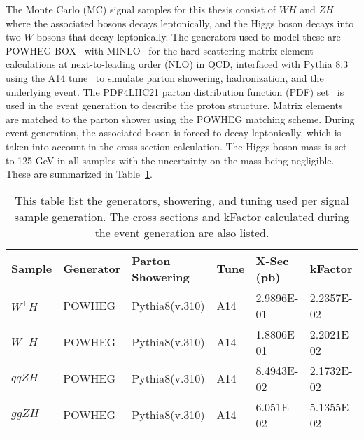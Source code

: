 The Monte Carlo (MC) signal samples for this thesis consist of $WH$ and $ZH$ where the associated bosons decays leptonically, and the Higgs boson decays into two $W$ bosons that decay leptonically. The generators used to model these are POWHEG-BOX~\cite{powheg} with MINLO~\cite{minlo} for the hard-scattering matrix element calculations at next-to-leading order (NLO) in QCD, interfaced with Pythia 8.3~\cite{pythia8.3} using the A14 tune~\cite{ATL-PHYS-PUB-2014-021} to simulate parton showering, hadronization, and the underlying event. The PDF4LHC21 parton distribution function (PDF) set~\cite{PDF4LHCWorkingGroup_pdfsetrun3} is used in the event generation to describe the proton structure. Matrix elements are matched to the parton shower using the POWHEG matching scheme. During event generation, the associated boson is forced to decay leptonically, which is taken into account in the cross section calculation. The Higgs boson mass is set to 125 GeV in all samples with the uncertainty on the mass being negligible. These are summarized in Table~\ref{tab:mc_signal_samples}.

\begin{table}
  \centering
  \begin{tabular}{l|l|l|l|l|l}
    \hline
    Sample & Generator & Parton Showering & Tune & X-Sec (pb) & kFactor \\
    \hline
    $W^{+}H$ & POWHEG & Pythia8(v.310) & A14 & 2.9896E-01 & 2.2357E-02 \\
    $W^{-}H$ & POWHEG & Pythia8(v.310) & A14 & 1.8806E-01 & 2.2021E-02 \\
    $qqZH$ & POWHEG & Pythia8(v.310) & A14 & 8.4943E-02 & 2.1732E-02 \\
    $ggZH$ & POWHEG & Pythia8(v.310) & A14 & 6.051E-02 & 5.1355E-02 \\
    \hline
  \end{tabular}
  \caption{This table list the generators, showering, and tuning used per signal sample generation. The cross sections and kFactor calculated during the event generation are also listed.}\label{tab:mc_signal_samples}
\end{table}